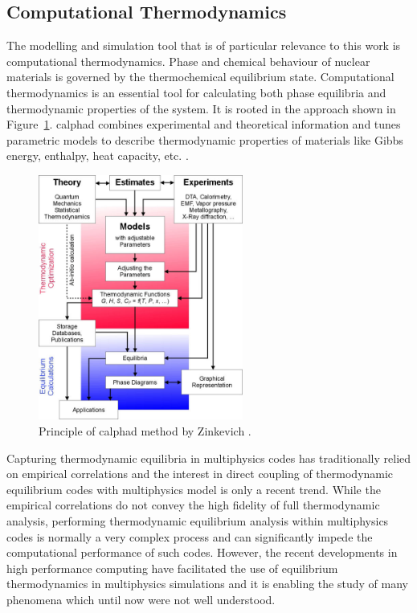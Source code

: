 \subsection{Computational Thermodynamics}
    The modelling and simulation tool that is of particular relevance to this work is computational thermodynamics. Phase and chemical behaviour of nuclear materials is governed by the thermochemical equilibrium state. Computational thermodynamics is an essential tool for calculating both phase equilibria and thermodynamic properties of the system. It is rooted in the \emph{} approach shown in Figure~\ref{fig:calphad}. \gls{calphad} combines experimental and theoretical information and tunes parametric models to describe thermodynamic properties of materials like Gibbs energy, enthalpy, heat capacity, etc. \cite{Lukas07}.
	\begin{figure}[htb]
		\centering
		\includegraphics[width=0.6\textwidth]{figures/chapter-1/Calphad_method}
		\caption[Principle of \gls{calphad} method]{Principle of \gls{calphad} method by Zinkevich \cite{Zinkevich:2003aa}.}
		\label{fig:calphad}
	\end{figure}

	Capturing thermodynamic equilibria in multiphysics codes has traditionally relied on empirical correlations and the interest in direct coupling of thermodynamic equilibrium codes with multiphysics model is only a recent trend. While the empirical correlations do not convey the high fidelity of full thermodynamic analysis, performing thermodynamic equilibrium analysis within multiphysics codes is normally a very complex process and can significantly impede the computational performance of such codes. However, the recent developments in high performance computing have facilitated the use of equilibrium thermodynamics in multiphysics  simulations and it is enabling the study of many phenomena which until now were not well understood.
	
